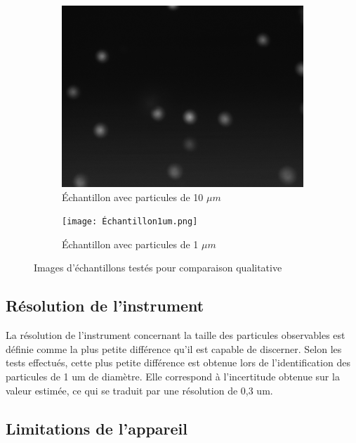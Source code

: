 \documentclass[11pt,letterpaper]{article}
\begin{document}
\begin{figure}[H]
  \begin{subfigure}[H]{0.45\textwidth}
    \centering
    \includegraphics[width=\textwidth]{essai_10um_2im_100ms.png}
    \caption{Échantillon avec particules de 10 $\mu m$}
  \end{subfigure}
  \hfill
  \begin{subfigure}[H]{0.45\textwidth}
    \centering
    \texttt{[image: Échantillon1um.png]}
    \caption{Échantillon avec particules de 1 $\mu m$}
  \end{subfigure}
  \caption{Images d'échantillons testés pour comparaison qualitative}
\end{figure}

\subsection{Résolution de l'instrument}

La résolution de l'instrument concernant la taille des particules observables est définie
comme la plus petite différence qu'il est capable de discerner. Selon les tests effectués, 
cette plus petite différence est obtenue lors de l'identification des particules de 1 um 
de diamètre. Elle correspond à l'incertitude obtenue sur la valeur estimée, ce qui se traduit
par une résolution de 0,3 um. 

\subsection{Limitations de l'appareil}
\end{document}
